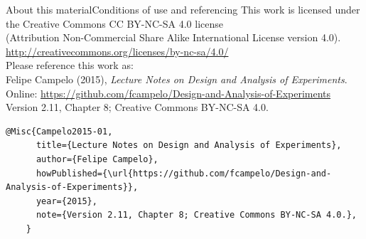 \documentclass[t]{beamer}
\begin{document}

\begin{ftstf}{About this material}{Conditions of use and referencing}
\centering\footnotesize This work is licensed under the Creative Commons CC BY-NC-SA 4.0 license\\(Attribution Non-Commercial Share Alike International License version 4.0).\\
\vhalf
\url{http://creativecommons.org/licenses/by-nc-sa/4.0/}\\
\vone
\footnotesize Please reference this work as:\\
\footnotesize \flushleft Felipe Campelo (2015), \textit{Lecture Notes on Design and Analysis of Experiments}.\\Online: {\scriptsize\url{https://github.com/fcampelo/Design-and-Analysis-of-Experiments}}\\
Version 2.11, Chapter 8; Creative Commons BY-NC-SA 4.0.\\

\begin{Verbatim}[fontsize=\tiny]
    @Misc{Campelo2015-01,
      title={Lecture Notes on Design and Analysis of Experiments},
      author={Felipe Campelo},
      howPublished={\url{https://github.com/fcampelo/Design-and-Analysis-of-Experiments}},
      year={2015},
      note={Version 2.11, Chapter 8; Creative Commons BY-NC-SA 4.0.},
    }
\end{Verbatim}

\end{ftstf}
\end{document}
